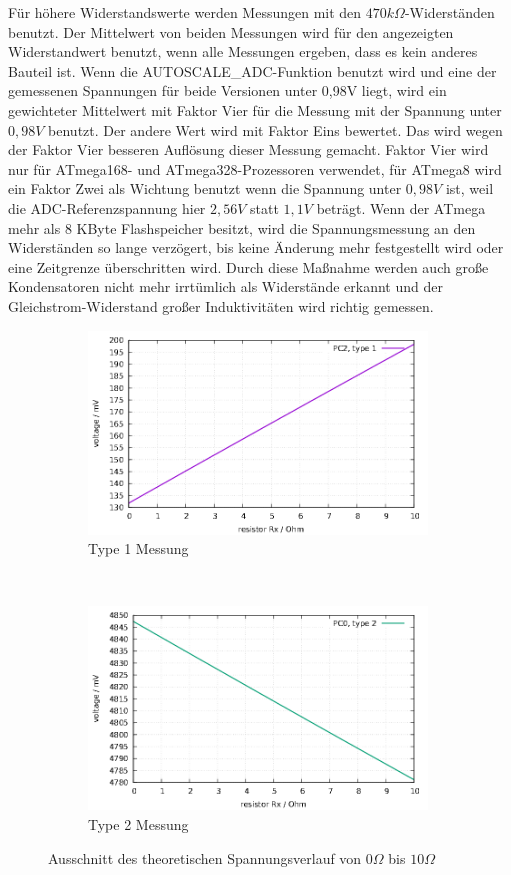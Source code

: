 Für höhere Widerstandswerte werden Messungen mit den \(470k\Omega\)-Widerständen benutzt.
Der Mittelwert von beiden Messungen wird für den angezeigten Widerstandwert benutzt, wenn alle Messungen ergeben,
dass es kein anderes Bauteil ist.
Wenn die AUTOSCALE\_ADC-Funktion benutzt wird und eine der gemessenen Spannungen für beide Versionen unter 0,98V liegt,
wird ein gewichteter Mittelwert mit Faktor Vier für die Messung mit der Spannung unter \(0,98V\) benutzt. Der andere Wert wird mit Faktor Eins bewertet.
Das wird wegen der Faktor Vier besseren Auflösung dieser Messung gemacht.
Faktor Vier wird nur für ATmega168- und ATmega328-Prozessoren verwendet, für ATmega8 wird ein
Faktor Zwei als Wichtung benutzt wenn die Spannung unter \(0,98V\) ist, weil die ADC-Referenzspannung hier \(2,56V\) statt \(1,1V\) beträgt.
Wenn der ATmega mehr als 8 KByte Flashspeicher besitzt, wird die Spannungsmessung an den Widerständen so lange verzögert,
bis keine Änderung mehr festgestellt wird oder eine Zeitgrenze überschritten wird.
Durch diese Maßnahme werden auch große Kondensatoren nicht mehr irrtümlich als
Widerstände erkannt und der Gleichstrom-Widerstand großer Induktivitäten wird richtig gemessen.

\begin{figure}[H]
  \begin{subfigure}[b]{9cm}
    \centering
    \includegraphics[width=9cm]{../GNU/RLvlow.pdf}
    \caption{Type 1 Messung}
    \label{fig:RLvlow}
  \end{subfigure}
  ~
  \begin{subfigure}[b]{9cm}
    \centering
    \includegraphics[width=9cm]{../GNU/RLvhigh.pdf}
    \caption{Type 2 Messung}
    \label{fig:RLvhigh}
  \end{subfigure}
  \caption{Ausschnitt des theoretischen Spannungsverlauf von \(0\Omega\) bis \(10\Omega\)}
\end{figure}


